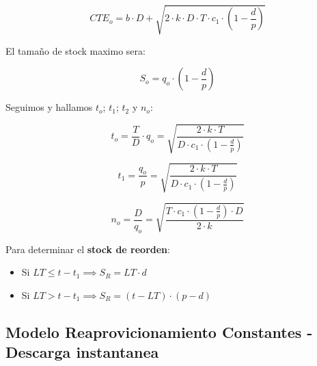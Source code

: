 \documentclass{article}
\begin{document}
\begin{equation}
    CTE_o = b \cdot D + \sqrt{2 \cdot k \cdot D \cdot T \cdot c_1 \cdot (1-\frac{d}{p})}
\end{equation}

El tamaño de  stock maximo sera:

\begin{equation}
    S_o = q_o \cdot (1-\frac{d}{p})
\end{equation}

Seguimos y hallamos \(t_o\); \(t_1\); \(t_2\) y \(n_o\):

\begin{equation}
    t_o = \frac{T}{D} \cdot q_o = \sqrt{\frac{2 \cdot k \cdot T}{D \cdot c_1 \cdot (1-\frac{d}{p})}}
\end{equation}


\begin{equation}
    t_1 = \frac{q_o}{p} = \sqrt{\frac{2 \cdot k \cdot T}{D \cdot c_1 \cdot (1-\frac{d}{p})}}
\end{equation}

\begin{equation}
    n_o = \frac{D}{q_o} = \sqrt{\frac{T \cdot c_1 \cdot (1-\frac{d}{p}) \cdot D }{2 \cdot k}}
\end{equation}

Para determinar el \textbf{stock de reorden}: 

\begin{itemize}
    \item Si \( LT \leq t-t_1 \implies S_R = LT \cdot d \)
    \item Si \( LT > t-t_1 \implies S_R = (t-LT) \cdot (p-d)\)    
\end{itemize}


\subsection{Modelo Reaprovicionamiento Constantes - Descarga instantanea}
\end{document}
